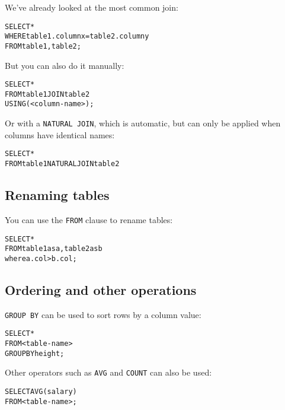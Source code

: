 \begin{mymulticols}
  We've already looked at the most common join:

  \begin{alltt}
  	SELECT *\\
  	WHERE table1.columnx = table2.columny\\
  	FROM table1, table2;
  \end{alltt}

  But you can also do it manually:

  \begin{alltt}
  	SELECT *\\
  	FROM table1 JOIN table2\\
  	USING (<column-name>);
  \end{alltt}

  Or with a \texttt{NATURAL JOIN}, which is automatic, but can only be applied
  when columns have identical names:

  \begin{alltt}
  	SELECT *\\
  	FROM table1 NATURAL JOIN table2
  \end{alltt}

  \subsection{Renaming tables}

  You can use the \texttt{FROM} clause to rename tables:

  \begin{alltt}
  	SELECT *\\
  	FROM table1 as a, table2 as b\\
  	where a.col > b.col;
  \end{alltt}

  \subsection{Ordering and other operations}

  \texttt{GROUP BY} can be used to sort rows by a column value:

  \begin{alltt}
  	SELECT *\\
  	FROM <table-name>\\
  	GROUP BY height;
  \end{alltt}

  Other operators such as \texttt{AVG} and \texttt{COUNT} can also be used:

  \begin{alltt}
  	SELECT AVG(salary)\\
  	FROM <table-name>;	
  \end{alltt}


\end{mymulticols}
